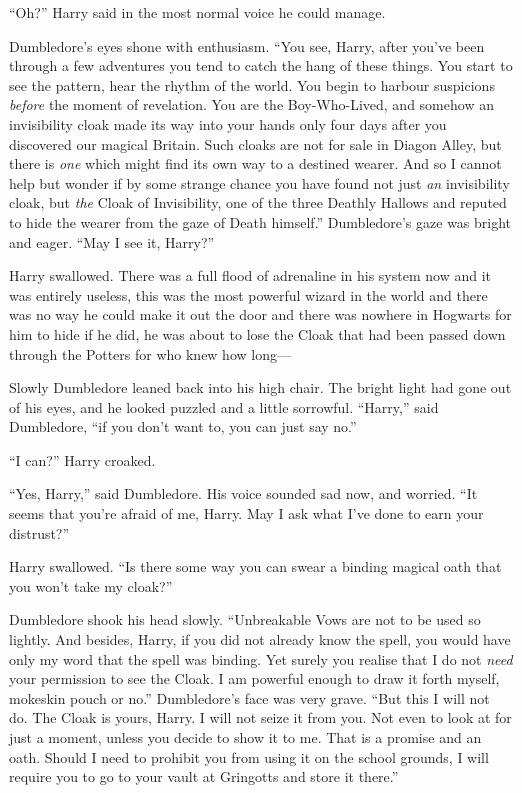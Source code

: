 “Oh?” Harry said in the most normal voice he could manage.

Dumbledore’s eyes shone with enthusiasm.
“You see, Harry, after you’ve been through a few adventures you tend to catch the hang of these things. You start to see the pattern, hear the rhythm of the world. You begin to harbour suspicions \emph{before} the moment of revelation. You are the Boy-Who-Lived, and somehow an invisibility cloak made its way into your hands only four days after you discovered our magical Britain. Such cloaks are not for sale in Diagon Alley, but there is \emph{one} which might find its own way to a destined wearer. And so I cannot help but wonder if by some strange chance you have found not just \emph{an} invisibility cloak, but \emph{the} Cloak of Invisibility, one of the three Deathly Hallows and reputed to hide the wearer from the gaze of Death himself.” Dumbledore’s gaze was bright and eager.
“May I see it, Harry?”

Harry swallowed. There was a full flood of adrenaline in his system now and it was entirely useless, this was the most powerful wizard in the world and there was no way he could make it out the door and there was nowhere in Hogwarts for him to hide if he did, he was about to lose the Cloak that had been passed down through the Potters for who knew how long—

Slowly Dumbledore leaned back into his high chair. The bright light had gone out of his eyes, and he looked puzzled and a little sorrowful.
“Harry,” said Dumbledore, “if you don’t want to, you can just say no.”

“I can?” Harry croaked.

“Yes, Harry,” said Dumbledore. His voice sounded sad now, and worried.
“It seems that you’re afraid of me, Harry. May I ask what I’ve done to earn your distrust?”

Harry swallowed.
“Is there some way you can swear a binding magical oath that you won’t take my cloak?”

Dumbledore shook his head slowly.
“Unbreakable Vows are not to be used so lightly. And besides, Harry, if you did not already know the spell, you would have only my word that the spell was binding. Yet surely you realise that I do not \emph{need} your permission to see the Cloak. I am powerful enough to draw it forth myself, mokeskin pouch or no.” Dumbledore’s face was very grave.
“But this I will not do. The Cloak is yours, Harry. I will not seize it from you. Not even to look at for just a moment, unless you decide to show it to me. That is a promise and an oath. Should I need to prohibit you from using it on the school grounds, I will require you to go to your vault at Gringotts and store it there.”

